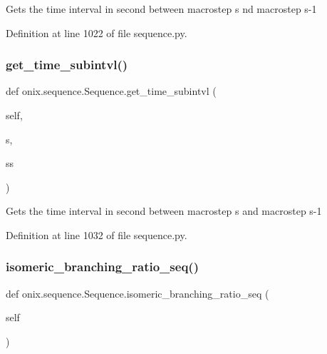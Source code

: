 \begin{DoxyVerb}Gets the time interval in second between macrostep s nd macrostep s-1
\end{DoxyVerb}
 

Definition at line 1022 of file sequence.\+py.

\mbox{\label{classonix_1_1sequence_1_1Sequence_a389b1c44ba38aba5e575c098ff0220c8}} 
\subsubsection{\texorpdfstring{get\+\_\+time\+\_\+subintvl()}{get\_time\_subintvl()}}
{\footnotesize\ttfamily def onix.\+sequence.\+Sequence.\+get\+\_\+time\+\_\+subintvl (\begin{DoxyParamCaption}\item[{}]{self,  }\item[{}]{s,  }\item[{}]{ss }\end{DoxyParamCaption})}

\begin{DoxyVerb}Gets the time interval in second between macrostep s and macrostep s-1
\end{DoxyVerb}
 

Definition at line 1032 of file sequence.\+py.

\mbox{\label{classonix_1_1sequence_1_1Sequence_ae7c83b9da70a30c2411671f5b12fbc7d}} 
\subsubsection{\texorpdfstring{isomeric\+\_\+branching\+\_\+ratio\+\_\+seq()}{isomeric\_branching\_ratio\_seq()}\hspace{0.1cm}{\footnotesize\ttfamily [1/2]}}
{\footnotesize\ttfamily def onix.\+sequence.\+Sequence.\+isomeric\+\_\+branching\+\_\+ratio\+\_\+seq (\begin{DoxyParamCaption}\item[{}]{self }\end{DoxyParamCaption})}

